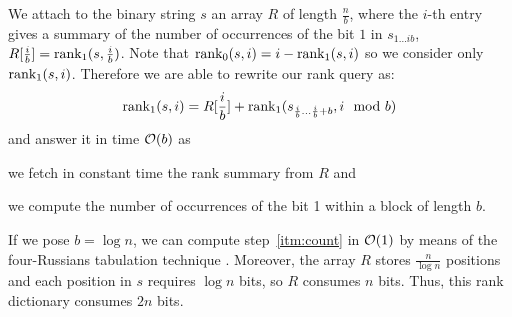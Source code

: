 We attach to the binary string $s$ an array $R$ of length $\frac{n}{b}$, where the $i$-th entry gives a summary of the number of occurrences of the bit $1$ in $s_{1 \dots i b}$, \ie $R[\frac{i}{b}] = \text{rank}_1(s, \frac{i}{b})$.
Note that $\text{rank}_0(s, i) = i - \text{rank}_1(s, i)$ so we consider only $\text{rank}_1(s, i)$.
Therefore we are able to rewrite our rank query as:
\begin{eqnarray}
\text{rank}_1(s,i) = R[\frac{i}{b}] + \text{rank}_1(s_{\frac{i}{b} \dots \frac{i}{b}+b}, i \mod{b})
\end{eqnarray}
and answer it in time $\mathcal{O}(b)$ as 
\begin{inparaenum}[(i)]
\item \label{itm:fetch} we fetch in constant time the rank summary from $R$ and
\item \label{itm:count} we compute the number of occurrences of the bit 1 within a block of length $b$.
\end{inparaenum}
If we pose $b=\log{n}$, we can compute step~\ref{itm:count} in $\mathcal{O}(1)$ by means of the four-Russians tabulation technique \citep{Arlazarov1975}.
Moreover, the array $R$ stores $\frac{n}{\log{n}}$ positions and each position in $s$ requires $\log{n}$ bits, so $R$ consumes $n$ bits.
Thus, this rank dictionary consumes $2n$ bits.

